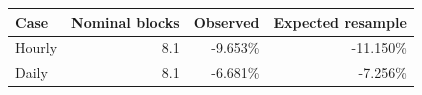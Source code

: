 \begin{tabular}{lrrr}
\toprule
Case & Nominal blocks & Observed & Expected resample\\
\midrule
Hourly & 8.1 & -9.653\% & -11.150\%\\
Daily & 8.1 & -6.681\% & -7.256\%\\
\bottomrule
\end{tabular}
